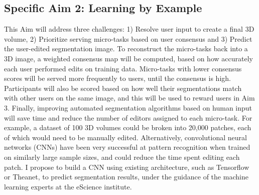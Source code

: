 
\subsection*{Specific Aim 2: Learning by Example}
This Aim will address three challenges: 1) Resolve user input to create a final 3D volume, 2) Prioritize serving micro-tasks based on user consensus and 3) Predict the user-edited segmentation image. To reconstruct the micro-tasks back into a 3D image, a weighted consensus map will be computed, based on how accurately each user performed edits on training data. Micro-tasks with lower consensus scores will be served more frequently to users, until the consensus is high. Participants will also be scored based on how well their segmentations match with other users on the same image, and this will be used to reward users in Aim 3. Finally, improving automated segmentation algorithms based on human input will save time and reduce the number of editors assigned to each micro-task. For example, a dataset of 100 3D volumes could be broken into 20,000 patches, each of which would need to be manually edited. Alternatively, convolutional neural networks (CNNs) have been very successful at pattern recognition when trained on similarly large sample sizes, and could reduce the time spent editing each patch. I propose to build a CNN using existing architecture, such as Tensorflow or Theanet, to predict segmentation results, under the guidance of the machine learning experts at the eScience institute. 

